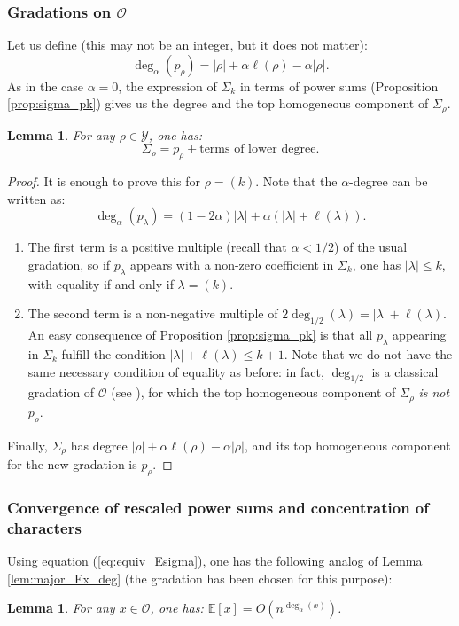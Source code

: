 \documentclass[10pt]{amsart}
\newtheorem{lemma}[theorem]{Lemma}
\theoremstyle{remark}
\newcommand{\young}{\mathscr{Y}}
\newcommand{\esper}{\mathbb{E}}
\newcommand{\obs}{\mathscr{O}}
\begin{document}
\subsubsection{Gradations on $\obs$}
Let us define (this may not be an integer, but it does not matter):
$$\deg_\alpha(p_\rho) = |\rho| + \alpha \ell(\rho) -\alpha |\rho|.$$
As in the case $\alpha=0$, the expression of $\varSigma_k$ in terms of power sums (Proposition \ref{prop:sigma_pk}) gives us the degree and the top homogeneous component of $\varSigma_\rho$.
\begin{lemma}\label{lem:prho_encore_dominant}
 For any $\rho \in \young$, one has:
$$\varSigma_\rho = p_\rho + \text{terms of lower degree}.$$
\end{lemma}
\begin{proof}
It is enough to prove this for $\rho=(k)$. Note that the $\alpha$-degree can be written as:
$$\deg_\alpha(p_\lambda)= (1 - 2 \alpha) |\lambda| + \alpha (|\lambda| + \ell(\lambda)).$$
\begin{enumerate}
\item The first term is a positive multiple (recall that $\alpha<1/2$) of the usual gradation, so if $p_\lambda$ appears with a non-zero coefficient in $\varSigma_k$, one has $|\lambda| \leq k$, with equality if and only if $\lambda=(k)$.
\item The second term is a non-negative multiple of $2 \deg_{1/2}(\lambda)=|\lambda| + \ell(\lambda)$. An easy consequence of Proposition \ref{prop:sigma_pk} is that all $p_\lambda$ appearing in $\varSigma_k$ fulfill the condition $|\lambda| + \ell(\lambda) \leq k+1$. Note that we do not have the same necessary condition of equality as before: in fact, $\deg_{1/2}$ is a classical gradation of $\obs$ (see \cite{IO02}), for which the top homogeneous component of $\varSigma_\rho$ \emph{is not} $p_\rho$.
\end{enumerate}
Finally, $\varSigma_\rho$ has degree $|\rho| + \alpha \ell(\rho) -\alpha |\rho|$, and its top homogeneous component for the new gradation is $p_\rho$.
\end{proof}\bigskip


\subsubsection{Convergence of rescaled power sums and concentration of characters}
Using equation (\ref{eq:equiv_Esigma}), one has the following analog of Lemma \ref{lem:major_Ex_deg} (the gradation has been chosen for this purpose):
\begin{lemma}\label{lem:Ex_encore_majore}
  For any $x \in \obs$, one has: 
$\esper[x] = O(n^{\deg_\alpha(x)})$.
\end{lemma}
\end{document}
